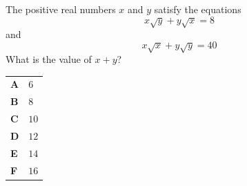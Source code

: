 \documentclass[11pt,a4paper]{article}
\begin{document}
\clearpage
\thispagestyle{djspaper}
\vspace*{8pt}
\begin{enumerate}[label=\textbf{\arabic*.},leftmargin=*,itemsep=0pt,start=19]
\questionitem[Algebra]
The positive real numbers $x$ and $y$ satisfy the equations
\[x\sqrt{y} + y\sqrt{x} = 8\]
and
\[x\sqrt{x} + y\sqrt{y} = 40\]
What is the value of $x + y$?

\par\vspace*{12pt}
\begin{tabularx}{\linewidth}{@{}>{\bfseries}l Y@{}}
A &
$6$
\\[0.8em]
B &
$8$
\\[0.8em]
C &
$10$
\\[0.8em]
D &
$12$
\\[0.8em]
E &
$14$
\\[0.8em]
F &
$16$
\\
\end{tabularx}
\end{enumerate}
\clearpage
\thispagestyle{djspaper}
\vspace*{8pt}
\end{document}
